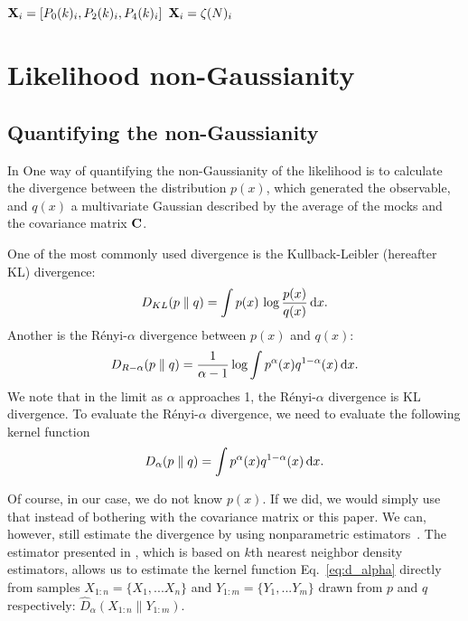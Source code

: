 \documentclass[12pt, letterpaper, preprint]{aastex}
\newcommand{\beq}{\begin{equation}}
\newcommand{\eeq}{\end{equation}}
\begin{document}
\subsection{}
${\bf X}_i = [P_0(k)_i,P_2(k)_i,P_4(k)_i]$
${\bf X}_i = \zeta(N)_i$


\section{Likelihood non-Gaussianity}
\subsection{Quantifying the non-Gaussianity}
In \cite{sellentin2017}
One way of quantifying the non-Gaussianity of the likelihood is to 
calculate the divergence between the distribution $p(x)$, which generated
the observable, and $q(x)$ a multivariate Gaussian described by the average
of the mocks and the covariance matrix ${\bf C}$.

One of the most commonly used divergence is the Kullback-Leibler 
(hereafter KL) divergence: 
\beq \label{eq:kl} 
D_{KL} ( p \parallel q ) = \int p(x)\,\log \frac{p(x)}{q(x)}\,{\rm d}x. 
\eeq
Another is the R\'enyi-$\alpha$ divergence between $p(x)$ and $q(x)$:
\beq \label{eq:renyi}
D_{R-\alpha} ( p \parallel q ) = \frac{1}{\alpha -1} \log \int p^\alpha(x) q^{1 -\alpha}(x)\,{\rm d}x. 
\eeq
We note that in the limit as $\alpha$ approaches 1, the R\'enyi-$\alpha$ 
divergence is KL divergence.
To evaluate the R\'enyi-$\alpha$ divergence, we need to evaluate the following
kernel function
\beq \label{eq:d_alpha}
D_{\alpha} ( p \parallel q ) = \int p^\alpha(x) q^{1-\alpha}(x)\,{\rm d}x. 
\eeq

Of course, in our case, we do not know $p(x)$. If we did, we would simply 
use that instead of bothering with the covariance matrix or this paper. We can,
however, still estimate the divergence by using nonparametric estimators~\citep{wang2009, poczos2012, krishnamurthy2014}. 
The estimator presented in 
\cite{poczos2012}, which is based on $k$th nearest neighbor density estimators, 
allows us to estimate the kernel function Eq.~\ref{eq:d_alpha} 
directly from samples $X_{1:n} = \{ X_1, ... X_n \}$ and $Y_{1:m} = \{ Y_1, ... Y_m \}$ 
drawn from $p$ and $q$ respectively: $\hat{D}_{\alpha}(X_{1:n} \parallel Y_{1:m})$. 
\end{document}

